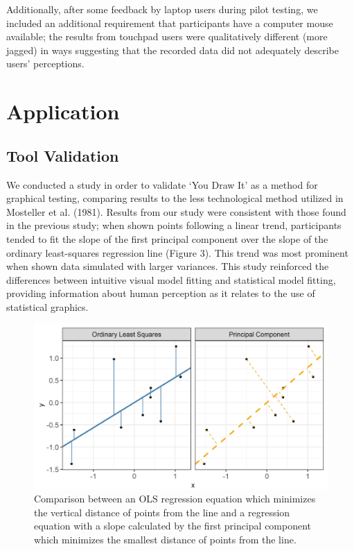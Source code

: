 \documentclass[
  letterpaper,
  DIV=11,
  numbers=noendperiod]{scrartcl}
\newcommand{\svp}[1]{{\textcolor{RedOrange}{#1}}}
\begin{document}
\svp{Additionally, after some feedback by laptop users during pilot testing, we included an additional requirement that participants have a computer mouse available; the results from touchpad users were qualitatively different (more jagged) in ways suggesting that the recorded data did not adequately describe users' perceptions.}

\hypertarget{application}{%
\section{Application}\label{application}}

\hypertarget{tool-validation}{%
\subsection{Tool Validation}\label{tool-validation}}

We conducted a study in order to validate `You Draw It' as a method for
graphical testing, comparing results to the less technological method
utilized in Mosteller et al. (1981). Results from our study were
consistent with those found in the previous study; when shown points
following a linear trend, participants tended to fit the slope of the
first principal component over the slope of the ordinary least-squares
regression line (Figure 3). This trend was most prominent when shown
data simulated with larger variances. This study reinforced the
differences between intuitive visual model fitting and statistical model
fitting, providing information about human perception as it relates to
the use of statistical graphics.

\begin{figure}[ht]
\begin{center}
\centerline{\includegraphics[width=\columnwidth]{images/pca-plot}}
\caption{Comparison between an OLS regression equation which minimizes the vertical distance of points from the line and a regression equation with a slope calculated by the first principal component which minimizes the smallest distance of points from the line.}
\label{pca-plot}
\end{center}
\end{figure}
\end{document}

